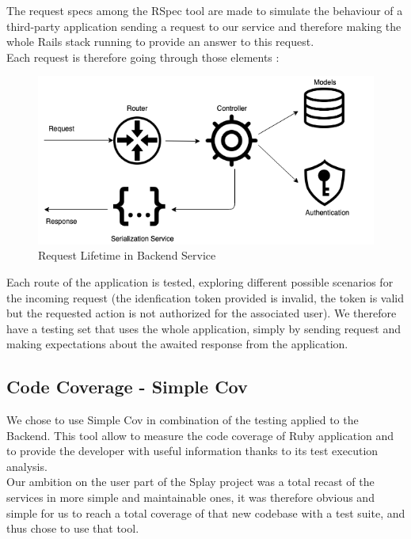 \documentclass{eplmastersthesis}
\begin{document}
          The request specs among the RSpec tool are made to simulate
          the behaviour of a third-party application sending a request to
          our service and therefore making the whole Rails stack running
          to provide an answer to this request.\\
          Each request is therefore going through those elements :\\

          \begin{figure}[H]
            \centering
            \includegraphics[scale=0.6]{figures/request_test.png}
            \caption{\label{request_test} Request Lifetime in Backend Service}
          \end{figure}

          Each route of the application is tested, exploring different possible
          scenarios for the incoming request (the idenfication token provided
          is invalid, the token is valid but the requested action is not
          authorized for the associated user). We therefore have a testing set
          that uses the whole application, simply by sending request and
          making expectations about the awaited response from the application.

      \subsection{Code Coverage - Simple Cov}

        We chose to use Simple Cov in combination of the testing applied to
        the Backend. This tool allow to measure the code coverage of Ruby
        application and to provide the developer with useful information
        thanks to its test execution analysis.\\

        Our ambition on the user part of the Splay project was a total recast of
        the services in more simple and maintainable ones, it was therefore
        obvious and simple for us to reach a total coverage of that new codebase
        with a test suite, and thus chose to use that tool.
\end{document}
